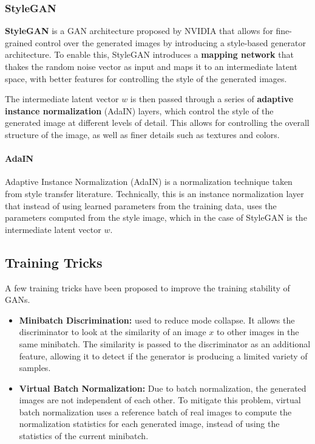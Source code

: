 \subsubsection{StyleGAN}
\textbf{StyleGAN} is a GAN architecture proposed by NVIDIA that allows for fine-grained control over the generated images by introducing a style-based generator architecture.
To enable this, StyleGAN introduces a \textbf{mapping network} that thakes the random noise vector as input and maps it to an intermediate latent space, with better features for controlling the style of the generated images.

The intermediate latent vector $w$ is then passed through a series of \textbf{adaptive instance normalization} (AdaIN) layers, which control the style of the generated image at different levels of detail. 
This allows for controlling the overall structure of the image, as well as finer details such as textures and colors.

\paragraph{AdaIN}
Adaptive Instance Normalization (AdaIN) is a normalization technique taken from style transfer literature. 
Technically, this is an instance normalization layer that instead of using learned parameters from the training data, 
uses the parameters computed from the style image, which in the case of StyleGAN is the intermediate latent vector $w$.

\subsection{Training Tricks}
A few training tricks have been proposed to improve the training stability of GANs.

\begin{itemize}
    \item \textbf{Minibatch Discrimination:} used to reduce mode collapse. It allows the discriminator to look at
    the similarity of an image $x$ to other images in the same minibatch. The similarity is passed to the discriminator as an additional feature,
    allowing it to detect if the generator is producing a limited variety of samples.
    \item \textbf{Virtual Batch Normalization:} Due to batch normalization, the generated images are not independent of each other.
    To mitigate this problem, virtual batch normalization uses a reference batch of real images to compute the normalization statistics for each generated image,
    instead of using the statistics of the current minibatch.
\end{itemize}

